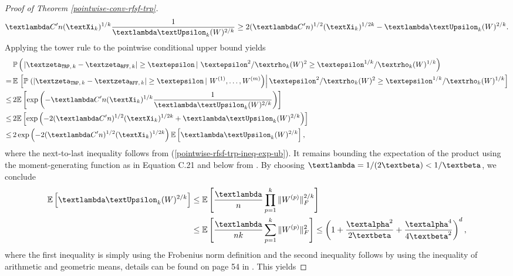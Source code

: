\documentclass[openany]{book}
\begin{document}
\begin{proof}[Proof of Theorem \ref{pointwise-conv-rfsf-trp}]
\begin{equation}
             \glambda C'n(\gXi_k)^{1/k}\frac{1}{\glambda\gUpsilon_k(W)^{2/k}}\geq 2(\glambda C'n)^{1/2} (\gXi_k)^{1/2k}-\glambda\gUpsilon_k(W)^{2/k}.
        \end{equation}
        Applying the tower rule to the pointwise conditional upper bound yields
        \begin{equation}\label{pointwise-conv-eq1}
        \begin{split}
            &\,\mathbb P\left(\left.\vert \gzeta_{\mathtt{TRP},\,k}-\gzeta_{\mathtt{RFF},\,k}\vert \geq \gepsilon\,\right\vert\,\gepsilon^2/\grho_k(W)^2\geq \gepsilon^{1/k}/\grho_k(W)^{1/k}\right)\\=&\,\mathbb E\left.\left[\mathbb P\left.\left(\vert \gzeta_{\mathtt{TRP},\,k}-\gzeta_{\mathtt{RFF},\,k}\vert\geq \gepsilon\,\right\vert\,W^{(1)},\dots,W^{(m)} \right)\right\vert\gepsilon^2/\grho_k(W)^2\geq \gepsilon^{1/k}/\grho_k(W)^{1/k} \right]\\\leq&\, 2\mathbb E\left[\exp\left(-\glambda C'n(\gXi_k)^{1/k}\frac{1}{\glambda\gUpsilon_k(W)^{2/k}}\right)\right]
            \\\leq&\, 2\mathbb E\left[\exp\left(-2(\glambda C'n)^{1/2} (\gXi_k)^{1/2k}+\glambda\gUpsilon_k(W)^{2/k}\right)\right]
            \\\leq&\,2\exp\left(-2(\glambda C'n)^{1/2} (\gXi_k)^{1/2k}\right)\mathbb E\left[\glambda\gUpsilon_k(W)^{2/k}\right],
        \end{split}
        \end{equation}
        where the next-to-last inequality follows from  (\ref{pointwise-rfsf-trp-ineq-exp-ub}). It remains bounding the expectation of the product using the moment-generating function as in Equation C.21 and below from \cite{toth2025}. By choosing $\glambda =1/(2\gbeta)<1/\gbeta$, we conclude
        \begin{equation*}
        \begin{split}
            \mathbb E\left[\glambda\gUpsilon_k(W)^{2/k}\right]&\leq \mathbb E\left[\frac{\glambda}{n}\prod_{p=1}^k\|W^{(p)}\|_F^{2/k} \right] \\&\leq \mathbb E\left[\frac{\glambda}{nk}\sum_{p=1}^k\|W^{(p)}\|_F^{2} \right]\leq \left(1+\frac{\galpha^2}{2\gbeta}+\frac{\galpha^4}{4\gbeta^2}\right)^{d},
        \end{split}
        \end{equation*}
        where the first inequality is simply using the Frobenius norm definition and the second inequality follows by using the inequality of arithmetic and geometric means, details can be found on page 54 in \cite{toth2025}. This yields

\end{proof}
\end{document}
